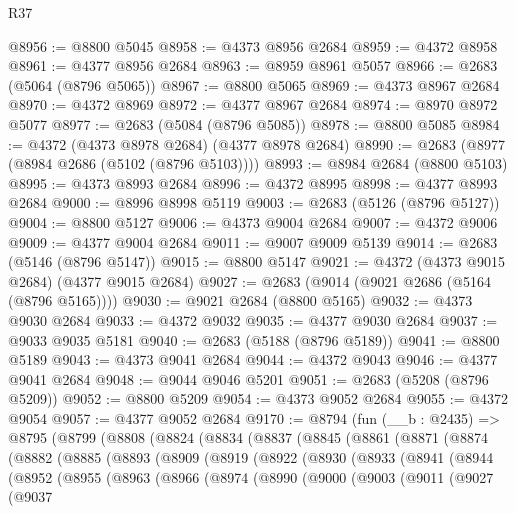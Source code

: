 \begin{lexlean}{R37}
\begin{coremodule}
@8956 := @8800 @5045
@8958 := @4373 @8956 @2684
@8959 := @4372 @8958
@8961 := @4377 @8956 @2684
@8963 := @8959 @8961 @5057
@8966 := @2683 (@5064 (@8796 @5065))
@8967 := @8800 @5065
@8969 := @4373 @8967 @2684
@8970 := @4372 @8969
@8972 := @4377 @8967 @2684
@8974 := @8970 @8972 @5077
@8977 := @2683 (@5084 (@8796 @5085))
@8978 := @8800 @5085
@8984 := @4372 (@4373 @8978 @2684) (@4377 @8978 @2684)
@8990 := @2683 (@8977 (@8984 @2686 (@5102 (@8796 @5103))))
@8993 := @8984 @2684 (@8800 @5103)
@8995 := @4373 @8993 @2684
@8996 := @4372 @8995
@8998 := @4377 @8993 @2684
@9000 := @8996 @8998 @5119
@9003 := @2683 (@5126 (@8796 @5127))
@9004 := @8800 @5127
@9006 := @4373 @9004 @2684
@9007 := @4372 @9006
@9009 := @4377 @9004 @2684
@9011 := @9007 @9009 @5139
@9014 := @2683 (@5146 (@8796 @5147))
@9015 := @8800 @5147
@9021 := @4372 (@4373 @9015 @2684) (@4377 @9015 @2684)
@9027 := @2683 (@9014 (@9021 @2686 (@5164 (@8796 @5165))))
@9030 := @9021 @2684 (@8800 @5165)
@9032 := @4373 @9030 @2684
@9033 := @4372 @9032
@9035 := @4377 @9030 @2684
@9037 := @9033 @9035 @5181
@9040 := @2683 (@5188 (@8796 @5189))
@9041 := @8800 @5189
@9043 := @4373 @9041 @2684
@9044 := @4372 @9043
@9046 := @4377 @9041 @2684
@9048 := @9044 @9046 @5201
@9051 := @2683 (@5208 (@8796 @5209))
@9052 := @8800 @5209
@9054 := @4373 @9052 @2684
@9055 := @4372 @9054
@9057 := @4377 @9052 @2684
@9170 := @8794
    (fun (__b : @2435) =>
    @8795
      (@8799
        (@8808
          (@8824
            (@8834
              (@8837
                (@8845
                  (@8861
                    (@8871
                      (@8874
                        (@8882
                          (@8885
                            (@8893
                              (@8909
                                (@8919
                                  (@8922
                                    (@8930
                                      (@8933
                                        (@8941
                                          (@8944
                                            (@8952
                                              (@8955
                                                (@8963
                                                  (@8966
                                                    (@8974
                                                      (@8990
                                                        (@9000
                                                          (@9003
                                                            (@9011
                                                              (@9027
                                                                (@9037

\end{coremodule}
\end{lexlean}
